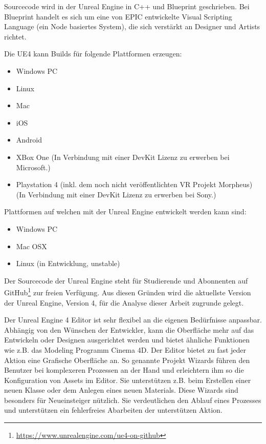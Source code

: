 \documentclass[pagesize, paper=a4, fontsize=12pt, titlepage=true, headings=small, headnosepline, abstractoff, liststotoc, nochapterprefix, plainheadsepline, twoside]{scrreprt}
\begin{document}
Sourcecode wird in der Unreal Engine in C++ und Blueprint geschrieben. Bei Blueprint handelt es sich um eine von EPIC entwickelte Visual Scripting Language (ein Node basiertes System), die sich verstärkt an Designer und Artists richtet.

Die UE4 kann Builds für folgende Plattformen erzeugen:
\begin{itemize}
\item Windows PC
\item Linux
\item Mac
\item iOS
\item Android
\item XBox One (In Verbindung mit einer DevKit Lizenz zu erwerben bei Microsoft.)
\item Playstation 4 (inkl. dem noch nicht veröffentlichten VR Projekt Morpheus) (In Verbindung mit einer DevKit Lizenz zu erwerben bei Sony.)
\end{itemize}

Plattformen auf welchen mit der Unreal Engine entwickelt werden kann sind:
\begin{itemize}
\item Windows PC
\item Mac OSX
\item Linux (in Entwicklung, unstable)
\end{itemize}

Der Sourcecode der Unreal Engine steht für Studierende und Abonnenten auf GitHub\footnote{\url{https://www.unrealengine.com/ue4-on-github}} zur freien Verfügung. Aus diesen Gründen wird die aktuellste Version der Unreal Engine, Version 4, für die Analyse dieser Arbeit zugrunde gelegt.

Der Unreal Engine 4 Editor ist sehr flexibel an die eigenen Bedürfnisse anpassbar. Abhängig von den Wünschen der Entwickler, kann die Oberfläche mehr auf das Entwickeln oder Designen ausgerichtet werden und bietet ähnliche Funktionen wie z.B. das Modeling Programm Cinema 4D. Der Editor bietet zu fast jeder Aktion eine Grafische Oberfläche an. So genannte Projekt Wizards führen den Benutzer bei komplexeren Prozessen an der Hand und erleichtern ihm so die Konfiguration von Assets im Editor. Sie unterstützen z.B. beim Erstellen einer neuen Klasse oder dem Anlegen eines neuen Materials. Diese Wizards sind besonders für Neueinsteiger nützlich. Sie verdeutlichen den Ablauf eines Prozesses und unterstützen ein fehlerfreies Abarbeiten der unterstützen Aktion.
\end{document}
